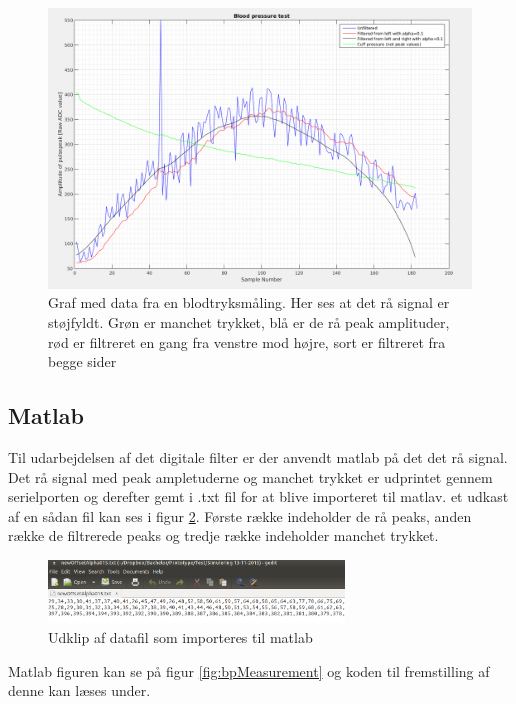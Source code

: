 \begin{figure}[H]
	\includegraphics[width=\textwidth]{Implementeringsdokument/billeder/4_11_2016_udenMap.png}
	\caption{Graf med data fra en blodtryksmåling. Her ses at det rå signal 	er støjfyldt. Grøn er manchet trykket, blå er de rå peak amplituder, rød er filtreret en gang fra venstre mod højre, sort er filtreret fra begge sider 	}\label{fig:filterWithoutMap}
\end{figure}

\subsection{Matlab} \label{title:Matlab}
Til udarbejdelsen af det digitale filter er der anvendt matlab på det det rå signal. Det rå signal med peak ampletuderne og manchet trykket er udprintet gennem serielporten og derefter gemt i .txt fil for at blive importeret til matlav. et udkast af en sådan fil kan ses i figur \ref{fig:dataFileExample}. Første række indeholder de rå peaks, anden række de filtrerede peaks og tredje række indeholder manchet trykket.
\begin{figure}[H]
	\centering
	\includegraphics[width=0.7\textwidth]{Implementeringsdokument/billeder/dataFileExample.png}
	\caption{Udklip af datafil som importeres til matlab}\label{fig:dataFileExample}
\end{figure}

Matlab figuren kan se på figur \ref{fig:bpMeasurement} og koden til fremstilling af denne kan læses under.

